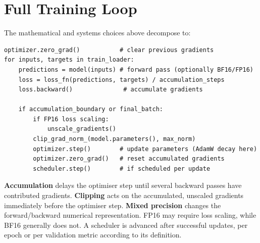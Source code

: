 \section{Full Training Loop}
\label{sec:optimisation-the-full-training-loop}
The mathematical and systems choices above decompose to:
\begin{lstlisting}
optimizer.zero_grad()           # clear previous gradients
for inputs, targets in train_loader:
    predictions = model(inputs) # forward pass (optionally BF16/FP16)
    loss = loss_fn(predictions, targets) / accumulation_steps
    loss.backward()              # accumulate gradients

    if accumulation_boundary or final_batch:
        if FP16 loss scaling:
            unscale_gradients()
        clip_grad_norm_(model.parameters(), max_norm)
        optimizer.step()        # update parameters (AdamW decay here)
        optimizer.zero_grad()   # reset accumulated gradients
        scheduler.step()        # if scheduled per update
\end{lstlisting}
\textbf{Accumulation} delays the optimiser step until several backward passes have contributed gradients.
\textbf{Clipping} acts on the accumulated, unscaled gradients immediately before the optimiser step.
\textbf{Mixed precision} changes the forward/backward numerical representation.
FP16 may require loss scaling, while BF16 generally does not.
A scheduler is advanced after successful updates, per epoch or per validation metric according to its definition.